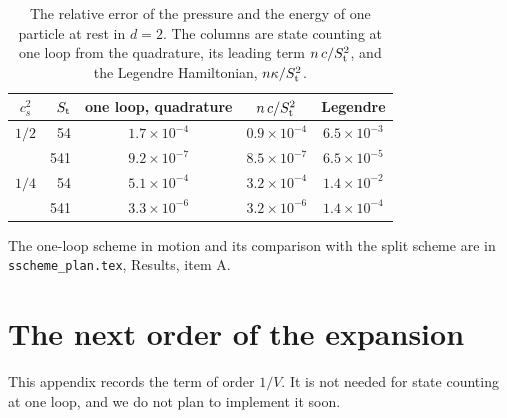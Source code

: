 \documentclass[11pt,aps,preprint,nofootinbib,superscriptaddress,tightenlines]{revtex4-2}
\begin{document}
\begin{table}[h]
\caption{The relative error of the pressure and the energy of one particle at rest in $d=2$.  The columns are state counting at one loop from the
quadrature, its leading term $n\,c/S_{\rm t}^2$, and the Legendre Hamiltonian, $n\kappa/S_{\rm t}^2$.}
\label{tab:acc}
\begin{ruledtabular}
\begin{tabular}{crccc}
$c_s^2$ & $S_{\rm t}$ & one loop, quadrature & $n\,c/S_{\rm t}^2$ & Legendre \\
\hline
$1/2$ & 54  & $1.7\times10^{-4}$ & $0.9\times10^{-4}$ & $6.5\times10^{-3}$ \\
      & 541 & $9.2\times10^{-7}$ & $8.5\times10^{-7}$ & $6.5\times10^{-5}$ \\
$1/4$ & 54  & $5.1\times10^{-4}$ & $3.2\times10^{-4}$ & $1.4\times10^{-2}$ \\
      & 541 & $3.3\times10^{-6}$ & $3.2\times10^{-6}$ & $1.4\times10^{-4}$ \\
\end{tabular}
\end{ruledtabular}
\end{table}
The one-loop scheme in motion and its comparison with the split scheme are in \nolinkurl{sscheme_plan.tex}, Results, item A.

\appendix

\section{The next order of the expansion}
\label{sec:next}

This appendix records the term of order $1/V$.  It is not needed for state counting at one loop, and we do not plan to implement it soon.
\end{document}
